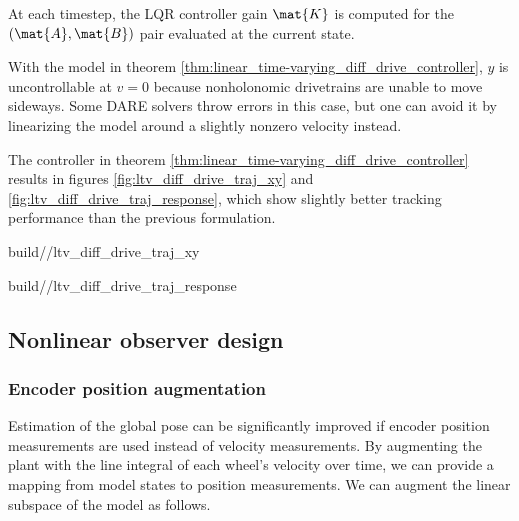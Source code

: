 \begin{theorem}
  At each timestep, the LQR controller gain $\mat{K}$ is computed for the
  $(\mat{A}, \mat{B})$ pair evaluated at the current state.
\end{theorem}

With the \gls{model} in theorem
\ref{thm:linear_time-varying_diff_drive_controller}, $y$ is uncontrollable at
$v = 0$ because nonholonomic drivetrains are unable to move sideways. Some DARE
solvers throw errors in this case, but one can avoid it by linearizing the model
around a slightly nonzero velocity instead.

The controller in theorem \ref{thm:linear_time-varying_diff_drive_controller}
results in figures \ref{fig:ltv_diff_drive_traj_xy} and
\ref{fig:ltv_diff_drive_traj_response}, which show slightly better tracking
performance than the previous formulation.
\begin{bookfigure}
  \begin{minisvg}{2}{build/\chapterpath/ltv_diff_drive_traj_xy}
    \caption{Linear time-varying differential drive controller x-y plot}
    \label{fig:ltv_diff_drive_traj_xy}
  \end{minisvg}
  \hfill
  \begin{minisvg}{2}{build/\chapterpath/ltv_diff_drive_traj_response}
    \caption{Linear time-varying differential drive controller response}
    \label{fig:ltv_diff_drive_traj_response}
  \end{minisvg}
\end{bookfigure}

\subsection{Nonlinear observer design}

\subsubsection{Encoder position augmentation}

Estimation of the global pose can be significantly improved if encoder position
measurements are used instead of velocity measurements. By augmenting the plant
with the line integral of each wheel's velocity over time, we can provide a
mapping from model states to position measurements. We can augment the linear
subspace of the model as follows.

